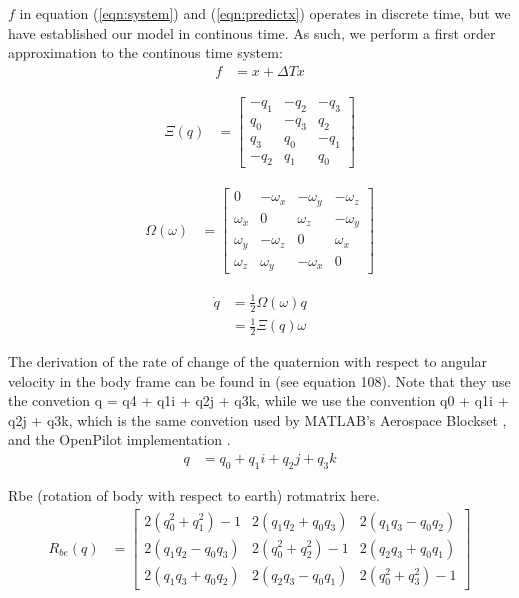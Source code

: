 \documentclass[]{article}
\begin{document}
{$f$ in equation (\ref{eqn:system}) and (\ref{eqn:predictx}) operates in discrete time, but we have established our model in continous time. As such, we perform a first order approximation to the continous time system:
\begin{align}
	f &= x + \Delta T \dot{x}
	\label{eqn:descrete_f}
\end{align}

\begin{align}
	\Xi(q) &=
	\left[
	\begin{matrix}
		-q_1 	& -q_2	& -q_3 	\\
		q_0		& -q_3 	& q_2 	\\
		q_3 	& q_0 	& -q_1 	\\
		-q_2 	& q_1 	& q_0
	\end{matrix}
	\right]
\end{align}

\begin{align}
	\Omega(\omega) &=
	\left[
	\begin{matrix}
		0 			& -\omega_x 	& -\omega_y	& -\omega_z	\\
		\omega_x 	& 0 			& \omega_z 	& -\omega_y \\
		\omega_y 	& -\omega_z 	& 0 		& \omega_x 	\\
		\omega_z 	& \omega_y		& -\omega_x & 0
	\end{matrix}
	\right]
\end{align}

\begin{align}
	\dot{q} 	&= \frac{1}{2} \Omega(\omega) q \\
				&= \frac{1}{2} \Xi(q) \omega
\end{align}

The derivation of the rate of change of the quaternion with respect to angular velocity in the body frame can be found in \cite{MARSlab} (see equation 108). Note that they use the convetion q = q4 + q1i + q2j + q3k, while we use the convention q0 + q1i + q2j + q3k, which is the same convetion used by MATLAB's Aerospace Blockset \cite{MATLABAerospace}, and the OpenPilot implementation \cite{OpenPilotPaper}.
\begin{align}
	q &= q_0 + q_1i + q_2j + q_3k
\end{align}

Rbe (rotation of body with respect to earth)
rotmatrix here.
\begin{align}
	R_{be}(q) &=
	\left[
	\begin{matrix}
		2(q_0^2 + q_1^2) - 1 	& 2(q_1 q_2 + q_0 q_3) 	& 2(q_1 q_3 - q_0 q_2) \\
		2(q_1 q_2 - q_0 q_3) 	& 2(q_0^2 + q_2^2) - 1 	& 2(q_2 q_3 + q_0 q_1) \\
		2(q_1 q_3 + q_0 q_2)	& 2(q_2 q_3 - q_0 q_1)	& 2(q_0^2 + q_3^2) - 1
	\end{matrix}
	\right]
\end{align}

}
\end{document}
